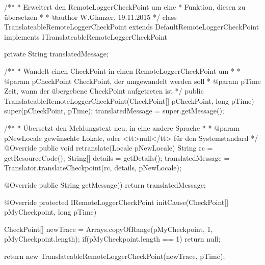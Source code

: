 \begin{spacing}{0.75}
	\begin{javacode}
/**
 * Erweitert den RemoteLoggerCheckPoint um eine
 * Funktion, diesen zu übersetzen
 *
 * @author W.Glanzer, 19.11.2015
 */
class TranslateableRemoteLoggerCheckPoint extends DefaultRemoteLoggerCheckPoint 
  implements ITranslateableRemoteLoggerCheckPoint
{
  private String translatedMessage;

  /**
   * Wandelt einen CheckPoint in einen RemoteLoggerCheckPoint um
   *
   * @param pCheckPoint CheckPoint, der umgewandelt werden soll
   * @param pTime       Zeit, wann der übergebene CheckPoint aufgetreten ist
   */
  public TranslateableRemoteLoggerCheckPoint(CheckPoint[] pCheckPoint, long pTime)
  {
    super(pCheckPoint, pTime);
    translatedMessage = super.getMessage();
  }
  
  /**
   * Übersetzt den Meldungstext neu, in eine andere Sprache
   *
   * @param pNewLocale gewünschte Lokale, oder <tt>null</tt> für den Systemstandard
   */
  @Override
  public void retranslate(Locale pNewLocale)
  {
    String rc = getResourceCode();
    String[] details = getDetails();
    translatedMessage = Translator.translateCheckpoint(rc, details, pNewLocale);
  }

  @Override
  public String getMessage()
  {
    return translatedMessage;
  }

  @Override
  protected IRemoteLoggerCheckPoint initCause(CheckPoint[] pMyCheckpoint, long pTime)
  {
    CheckPoint[] newTrace = Arrays.copyOfRange(pMyCheckpoint, 1, pMyCheckpoint.length);
    if(pMyCheckpoint.length == 1)
      return null;
      
    return new TranslateableRemoteLoggerCheckPoint(newTrace, pTime);
  }
}  \end{javacode}
\end{spacing}